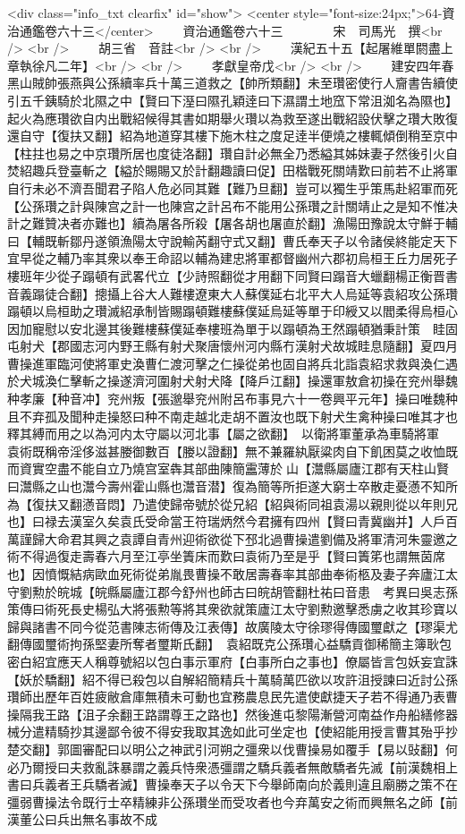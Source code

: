 <div class="info_txt clearfix" id="show">
<center style="font-size:24px;">64-資治通鑑卷六十三</center>
  　　資治通鑑卷六十三　　　　宋　司馬光　撰<br />
<br />
　　胡三省　音註<br />
<br />
　　漢紀五十五【起屠維單閼盡上章執徐凡二年】<br />
<br />
　　孝獻皇帝戊<br />
<br />
　　建安四年春黑山賊帥張燕與公孫續率兵十萬三道救之【帥所類翻】未至瓚密使行人齎書告續使引五千銕騎於北隰之中【賢曰下溼曰隰孔穎逹曰下濕謂土地窊下常沮洳名為隰也】起火為應瓚欲自内出戰紹候得其書如期舉火瓚以為救至遂出戰紹設伏擊之瓚大敗復還自守【復扶又翻】紹為地道穿其樓下施木柱之度足逹半便燒之樓輒傾倒稍至京中【柱拄也易之中京瓚所居也度徒洛翻】瓚自計必無全乃悉縊其姊妹妻子然後引火自焚紹趣兵登臺斬之【縊於賜賜又於計翻趣讀曰促】田楷戰死關靖歎曰前若不止將軍自行未必不濟吾聞君子陷人危必同其難【難乃旦翻】豈可以獨生乎策馬赴紹軍而死【公孫瓚之計與陳宫之計一也陳宫之計呂布不能用公孫瓚之計關靖止之是知不惟决計之難贊决者亦難也】續為屠各所殺【屠各胡也屠直於翻】漁陽田豫說太守鮮于輔曰【輔既斬鄒丹遂領漁陽太守說輸芮翻守式又翻】曹氏奉天子以令諸侯終能定天下宜早從之輔乃率其衆以奉王命詔以輔為建忠將軍都督幽州六郡初烏桓王丘力居死子樓班年少從子蹋頓有武畧代立【少詩照翻從才用翻下同賢曰蹋音大蠟翻楊正衡晋書音義蹋徒合翻】摠攝上谷大人難樓遼東大人蘇僕延右北平大人烏延等袁紹攻公孫瓚蹋頓以烏桓助之瓚滅紹承制皆賜蹋頓難樓蘇僕延烏延等單于印綬又以閻柔得烏桓心因加寵慰以安北邊其後難樓蘇僕延奉樓班為單于以蹋頓為王然蹋頓猶秉計策　眭固屯射犬【郡國志河内野王縣有射犬聚唐懷州河内縣冇漢射犬故城眭息隨翻】夏四月曹操進軍臨河使將軍史渙曹仁渡河擊之仁操從弟也固自將兵北詣袁紹求救與渙仁遇於犬城渙仁擊斬之操遂濟河圍射犬射犬降【降戶江翻】操還軍敖倉初操在兖州舉魏种孝廉【种音冲】兖州叛【張邈舉兖州附呂布事見六十一卷興平元年】操曰唯魏种且不弃孤及聞种走操怒曰种不南走越北走胡不置汝也既下射犬生禽种操曰唯其才也釋其縛而用之以為河内太守屬以河北事【屬之欲翻】　以衛將軍董承為車騎將軍　袁術既稱帝淫侈滋甚媵御數百【媵以證翻】無不兼羅紈厭粱肉自下飢困莫之收恤既而資實空盡不能自立乃燒宫室犇其部曲陳簡靁薄於山【灊縣屬廬江郡有天柱山賢曰灊縣之山也灊今壽州霍山縣也灊音潜】復為簡等所拒遂大窮士卒散走憂懣不知所為【復扶又翻懣音悶】乃遣使歸帝號於從兄紹【紹與術同祖袁湯以親則從以年則兄也】曰禄去漢室久矣袁氏受命當王符瑞炳然今君擁有四州【賢曰青冀幽并】人戶百萬謹歸大命君其興之袁譚自青州迎術欲從下邳北過曹操遣劉備及將軍清河朱靈邀之術不得過復走壽春六月至江亭坐簀床而歎曰袁術乃至是乎【賢曰簀笫也謂無茵席也】因憤慨結病歐血死術從弟胤畏曹操不敢居壽春率其部曲奉術柩及妻子奔廬江太守劉勲於皖城【皖縣屬廬江郡今舒州也師古曰皖胡管翻杜祐曰音患　考異曰吳志孫策傳曰術死長史楊弘大將張勲等將其衆欲就策廬江太守劉勲邀擊悉虜之收其珍寶以歸與諸書不同今從范書陳志術傳及江表傳】故廣陵太守徐璆得傳國璽獻之【璆渠尤翻傳國璽術拘孫堅妻所奪者璽斯氏翻】　袁紹既克公孫瓚心益驕貢御稀簡主簿耿包密白紹宜應天人稱尊號紹以包白事示軍府【白事所白之事也】僚屬皆言包妖妄宜誅【妖於驕翻】紹不得已殺包以自解紹簡精兵十萬騎萬匹欲以攻許沮授諫曰近討公孫瓚師出歷年百姓疲敝倉庫無積未可動也宜務農息民先遣使獻捷天子若不得通乃表曹操隔我王路【沮子余翻王路謂尊王之路也】然後進屯黎陽漸營河南益作舟船繕修器械分遣精騎抄其邊鄙令彼不得安我取其逸如此可坐定也【使紹能用授言曹其殆乎抄楚交翻】郭圖審配曰以明公之神武引河朔之彊衆以伐曹操易如覆手【易以䜴翻】何必乃爾授曰夫救亂誅暴謂之義兵恃衆憑彊謂之驕兵義者無敵驕者先滅【前漢魏相上書曰兵義者王兵驕者滅】曹操奉天子以令天下今舉師南向於義則違且廟勝之策不在彊弱曹操法令既行士卒精練非公孫瓚坐而受攻者也今弃萬安之術而興無名之師【前漢董公曰兵出無名事故不成